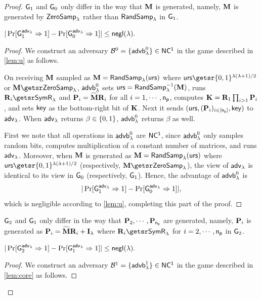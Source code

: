 \begin{proof}
 $\mathsf{G}_1$ and $\mathsf{G}_0$ only differ in the way that $\mathbf{{M}}$ is generated, namely, $\mathbf{{M}}$ is generated by ${\mathsf{ZeroSamp}}_\lambda$ rather than ${\mathsf{RandSamp}}_\lambda$ in $\mathsf{G}_1$.

\begin{lemma}
\label{lem:ncnike-0}
$
|\Pr[\mathsf{G}_1^{{\mathsf{adv}}_\lambda}\Rightarrow 1]-\Pr[\mathsf{G}_0^{{\mathsf{adv}}_\lambda}\Rightarrow 1]|\leq\mathsf{negl}(\lambda).
$
\end{lemma}
\begin{proof}
We construct an adversary $\mathcal{B}^0=\{\mathsf{advb}_{\lambda}^0\}\in\mathsf{NC^1}$ in the game described in \cref{lem:u} as follows. %

On receiving $\mathbf{{M}}$ sampled as $\mathbf{{M}}={\mathsf{RandSamp}}_\lambda(\mathsf{urs})$ where $\urs\getsr\bin^{\lambda(\lambda+1)/2}$ or $\matr M\getsr\zs$, $\mathsf{advb}_{\lambda}^0$ sets $\mathsf{urs}={\mathsf{RandSamp}}_\lambda^{-1}(\mathbf{{M}})$, runs $\sR_i\getsr\sr$ and $\mathbf{{P}}_i=\widetilde{\mathbf{{M}}}{\mathbf{{R}}}_i$ for all $i=1,\cdots,\mathsf{n_p}$, computes $\mathbf{{K}}={\mathbf{{R}}}_1\prod_{i>1}\mathbf{{P}}_i$, and sets $\mathsf{key}$ as the bottom-right bit of $\mathbf{{K}}$. Next it sends $(\mathsf{urs},(\mathbf{{P}}_i)_{i\in[\mathsf{n_p}]},\mathsf{key})$ to ${\mathsf{adv}}_\lambda$. When ${\mathsf{adv}}_\lambda$ returns $\beta\in\{0, 1\}$, $\mathsf{advb}_{\lambda}^0$ returns $\beta$ as well.

First we note that all operations in $\mathsf{advb}_{\lambda}^0$ are $\mathsf{NC^1}$, since $\mathsf{advb}_{\lambda}^0$ only samples random bits, computes multiplication of a constant number of matrices, and runs ${\mathsf{adv}}_\lambda$.
Moreover, when $\mathbf{{M}}$ is generated as $\mathbf{{M}}={\mathsf{RandSamp}}_\lambda(\mathsf{urs})$ where $\urs\getsr\bin^{\lambda(\lambda+1)/2}$ (respectively, $\matr M\getsr\zs$), the view of ${\mathsf{adv}}_\lambda$ is identical to its view in $\mathsf{G}_0$ (respectively, $\mathsf{G}_1$). Hence, the advantage of $\mathsf{advb}_{\lambda}^0$ is 
 $$
 |\Pr[\mathsf{G}_1^{{\mathsf{adv}}_\lambda}\Rightarrow 1]-\Pr[\mathsf{G}_0^{{\mathsf{adv}}_\lambda}\Rightarrow 1]|
 ,$$
which is negligible according to \cref{lem:u}, completing this part of the proof.
 \end{proof}


 $\mathsf{G}_2$ and $\mathsf{G}_1$ only differ in the way that $\mathbf{{P}}_2,\cdots,\mathbf{{P}}_{\mathsf{n_p}}$ are generated, namely, $\mathbf{{P}}_i$ is generated as $\mathbf{{P}}_i=\widetilde{\mathbf{{M}}}{\mathbf{{R}}}_i+{\mathbf{{I}}}_{\lambda}$ where $\sR_i\getsr\sr$ for $i=2,\cdots,\mathsf{n_p}$ in $\mathsf{G}_2$.

\begin{lemma}
\label{lem:ncnike-1}
$
|\Pr[\mathsf{G}_2^{{\mathsf{adv}}_\lambda}\Rightarrow 1]-\Pr[\mathsf{G}_1^{{\mathsf{adv}}_\lambda}\Rightarrow 1]|\leq\mathsf{negl}(\lambda).
$
\end{lemma}
\begin{proof}
We construct an adversary $\mathcal{B}^1=\{\mathsf{advb}_{\lambda}^1\}\in\mathsf{NC^1}$ in the game described in \cref{lem:core} as follows.


\end{proof}
\end{proof}

